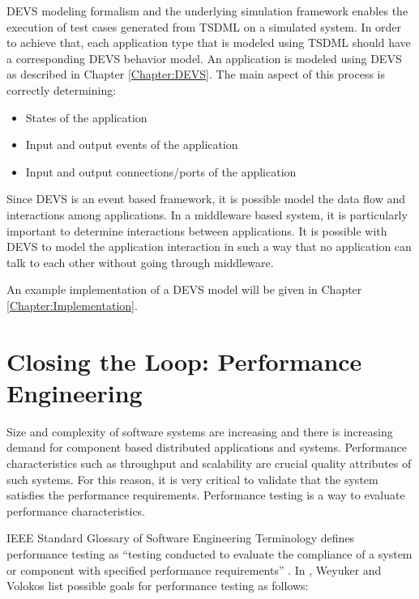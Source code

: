 DEVS modeling formalism and the underlying simulation framework enables the execution of test cases generated from TSDML on a simulated system. In order to achieve that, each application type that is modeled using TSDML should have a corresponding DEVS behavior model. An application is modeled using DEVS as described in Chapter \ref{Chapter:DEVS}. The main aspect of this process is correctly determining:

\begin{itemize}
	\item States of the application
	\item Input and output events of the application
	\item Input and output connections/ports of the application
\end{itemize}

Since DEVS is an event based framework, it is possible model the data flow and interactions among applications. In a middleware based system, it is particularly important to determine interactions between applications. It is possible with DEVS to model the application interaction in such a way that no application can talk to each other without going through middleware. 

An example implementation of a DEVS model will be given in Chapter \ref{Chapter:Implementation}.

\section{Closing the Loop: Performance Engineering}
Size and complexity of software systems are increasing and there is increasing demand for component based distributed applications and systems. Performance characteristics such as throughput and scalability are crucial quality attributes of such systems. For this reason, it is very critical to validate that the system satisfies the performance requirements. Performance testing is a way to evaluate performance characteristics. 

IEEE Standard Glossary of Software Engineering Terminology defines performance testing as ``testing conducted to evaluate the compliance of a system or component with specified performance requirements'' \cite{ieee_90}. In \cite{Weyuker00}, Weyuker and Volokos list possible goals for performance testing as follows:
	
